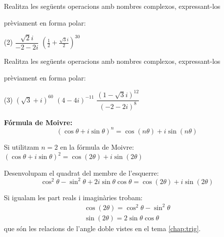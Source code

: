 \begin{mylist}	
 
	
	\exer
	Realitza les següents operacions amb nombres complexos, expressant-los

	prèviament en forma polar:

	\begin{tasks}(2)
		\task $\dfrac{\sqrt{2} i}{-2-2i}$
		\task $\left(\frac{1}{2} + \frac{\sqrt{3}i}{2}\right)^{30}$
	\end{tasks}


\answers[cols=1]{[$\dfrac{\sqrt{2} i}{-2-2i}=\dfrac{\sqrt{2}_{90}}{2\sqrt{2}_{-135}}=\dfrac{1}{2}_{225}=\dfrac{1}{2} (\cos 225 + i \sin 255)=-\dfrac{1}{4}(1+i)$, 
 $\left(\frac{1}{2} + \frac{\sqrt{3}i}{2}\right)^{30}=\left( 1_{60^\circ} \right)^{30}= 1_{1800^\circ}=1$
	]}
	
	\exer
	Realitza les següents operacions amb nombres complexos, expressant-los

	prèviament en forma polar:

	\begin{tasks}(3)
		\task $(\sqrt{3}+i)^{60}$
		\task $(4-4i)^{-11}$
		\task $\dfrac{(1-\sqrt{3} i)^{12}}{(-2-2i)^8}$
	\end{tasks}
	
	\answers[cols=1]{[$(\sqrt{3}+i)^{60}=(2_{30})^{60}=2^{60}_{1800}=2^{60}$,
		$(4-4i)^{-11}=(4\sqrt{2}_{-45^\circ})^{-11}=\frac{1}{2^{27}\sqrt{2}}_{495}=\frac{1}{2^{27}\sqrt{2}}_{135}=\frac{1}{2^{27}\sqrt{2}}(\cos 135 + i \sin 135)=\frac{1}{2^{28}} (-1+i)$,
		$\dfrac{(1-\sqrt{3} i)^{12}}{(-2-2i)^8}=\dfrac{(2_{-60^\circ})^{12}}{(2\sqrt{2}_{-135^\circ})^8}=
		\dfrac{2^{12}_{-720^\circ}}{2^{12}_{-1080^\circ}}=1_{360^\circ}=1$]}
	
\end{mylist}

\begin{theorybox}
 \textbf{Fórmula de Moivre: }
 \begin{equation*}
	(\cos \theta + i \sin \theta)^n = \cos(n \theta) + i \sin(n \theta)	 
 \end{equation*}
\end{theorybox}	
\vspace{-0.75cm}
\begin{example}
	Si utilitzam $n=2$ en la fórmula de Moivre:
	$	(\cos \theta + i \sin \theta)^2 = \cos(2 \theta) + i \sin(2 \theta) $
	
	Desenvolupam el quadrat del membre de l'esquerre:
		\[	\cos^2 \theta -  \sin^2 \theta + 2 i \sin \theta \cos \theta= \cos(2 \theta) + i \sin(2 \theta) \]
		
	Si igualam les part reals i imaginàries	trobam:
		\[ \begin{array}{l}	\cos (2\theta) = \cos^2 \theta -  \sin^2 \theta 	\\ \sin(2\theta) = 2\sin \theta \cos \theta  \end{array} \]
	que són les relacions de l'angle doble vistes en el tema \ref{chap:trig}.
\end{example}

